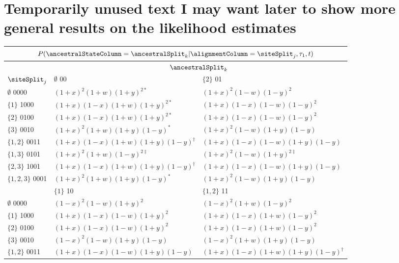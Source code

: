\section{Temporarily unused text I may want later to show more general results on the likelihood estimates}


\begin{table}
\centering
\begin{tabular}{|l|ll|}
\multicolumn{3}{c}{$P(\ancestralStateColumn=\ancestralSplit_k|\alignmentColumn=\siteSplit_j,\tau_1,t)$}\\
\hline
& \multicolumn{2}{|c|}{$\ancestralSplit_k$}\\
    \hline
    $\siteSplit_j$    &$\emptyset$  00                              &$\{2\}$  01\\
    \hline
     $\emptyset$   0000&$(1+x)^2   (1+w)(1+y)^{2*}$          &$(1+x)^2   (1-w)(1-y)^2$\\
     $\{1\}$       1000&$(1+x)(1-x)(1+w)(1+y)^{2*}$          &$(1+x)(1-x)(1-w)(1-y)^2$\\
     $\{2\}$       0100&$(1+x)(1-x)(1+w)(1+y)^{2*}$          &$(1+x)(1-x)(1-w)(1-y)^2$\\
     $\{3\}$       0010&$(1+x)^2   (1+w)(1+y)(1-y)^*$        &$(1+x)^2   (1-w)(1+y)(1-y)$\\
     $\{1,2\}$     0011&$(1+x)(1-x)(1+w)(1+y)(1-y)^{\dagger}$&$(1+x)(1-x)(1-w)(1+y)(1-y)$\\
     $\{1,3\}$     0101&$(1+x)^2   (1+w)(1-y)^{2\ddagger}$   &$(1+x)^2   (1-w)(1+y)^{2\ddagger}$\\
     $\{2,3\}$     1001&$(1+x)(1-x)(1+w)(1+y)(1-y)^{\dagger}$&$(1+x)(1-x)(1-w)(1+y)(1-y)$\\
     $\{1,2,3\}$   0001&$(1+x)^2   (1+w)(1+y)(1-y)^*$        &$(1+x)^2   (1-w)(1+y)(1-y)$\\
    \hline
    \hline
    &$\{1\}$  10                           &$\{1,2\}$  11\\
    \hline
     $\emptyset$   0000&$(1-x)^2   (1-w)(1+y)^2$     &$(1-x)^2   (1+w)(1-y)^2$\\
     $\{1\}$       1000&$(1+x)(1-x)(1-w)(1+y)^2$     &$(1+x)(1-x)(1+w)(1-y)^2$\\
     $\{2\}$       0100&$(1+x)(1-x)(1-w)(1+y)^2$     &$(1+x)(1-x)(1+w)(1-y)^2$\\
     $\{3\}$       0010&$(1-x)^2   (1-w)(1+y)(1-y)$  &$(1-x)^2   (1+w)(1+y)(1-y)$\\
     $\{1,2\}$     0011&$(1+x)(1-x)(1-w)(1+y)(1-y)$  &$(1+x)(1-x)(1+w)(1+y)(1-y)^{\dagger}$\\

\end{tabular}
\end{table}
